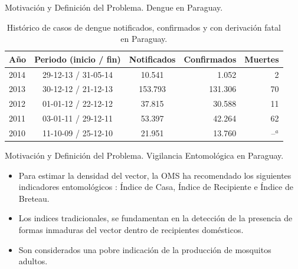 
\begin{frame}[t]{Motivación y Definición del Problema. Dengue en Paraguay.}
  \begin{center}
  \begin{table}
      \begin{minipage}{\textwidth}
          \begin{center}
          \caption{Histórico de casos de dengue notificados, confirmados y con derivación fatal en Paraguay.}
          \begin{tabular}{l c c r r}
              \hline
              Año & Periodo (inicio / fin) & Notificados & Confirmados & Muertes\\
              \hline
              \hline
              2014 & 29-12-13 / 31-05-14 & 10.541 & 1.052 & 2\\
              2013 & 30-12-12 / 21-12-13 & 153.793 & 131.306 & 70\\
              2012 & 01-01-12 / 22-12-12 & 37.815 & 30.588 & 11\\
              2011 & 03-01-11 / 29-12-11 & 53.397 & 42.264 & 62\\
              2010 & 11-10-09 / 25-12-10 & 21.951 & 13.760 & --$^a$
          \end{tabular}
          \end{center}
      \end{minipage}
  \end{table}
  \end{center}
\end{frame}


\begin{frame}[t]{Motivación y Definición del Problema. Vigilancia Entomológica en Paraguay.}

    \begin{itemize}
      \item Para estimar la densidad del vector, la OMS ha recomendado los siguientes indicadores entomológicos : Índice de Casa, Índice de Recipiente e Índice de Breteau.

      \item  Los indices tradicionales, se fundamentan en la detección de la presencia de formas inmaduras del vector dentro de recipientes domésticos.

      \item Son considerados una pobre indicación de la producción de mosquitos adultos.

    \end{itemize}
\end{frame}

